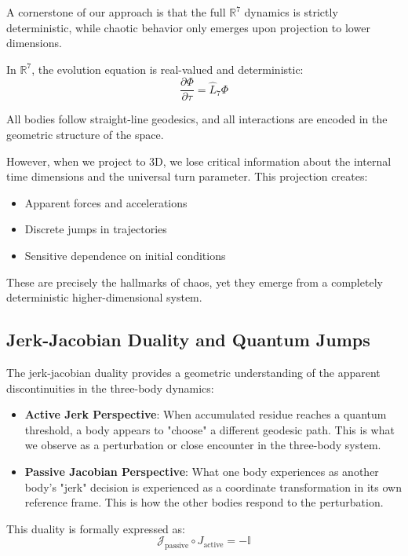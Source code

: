 \documentclass{article}
\begin{document}
A cornerstone of our approach is that the full $\mathbb{R}^7$ dynamics is strictly deterministic, while chaotic behavior only emerges upon projection to lower dimensions.

In $\mathbb{R}^7$, the evolution equation is real-valued and deterministic:
\begin{equation}
\frac{\partial \Phi}{\partial \tau} = \hat{L}_7 \Phi
\end{equation}

All bodies follow straight-line geodesics, and all interactions are encoded in the geometric structure of the space.

However, when we project to 3D, we lose critical information about the internal time dimensions and the universal turn parameter. This projection creates:
\begin{itemize}
\item Apparent forces and accelerations
\item Discrete jumps in trajectories
\item Sensitive dependence on initial conditions
\end{itemize}

These are precisely the hallmarks of chaos, yet they emerge from a completely deterministic higher-dimensional system.

\subsection{Jerk-Jacobian Duality and Quantum Jumps}

The jerk-jacobian duality provides a geometric understanding of the apparent discontinuities in the three-body dynamics:

\begin{itemize}
\item \textbf{Active Jerk Perspective}: When accumulated residue reaches a quantum threshold, a body appears to "choose" a different geodesic path. This is what we observe as a perturbation or close encounter in the three-body system.

\item \textbf{Passive Jacobian Perspective}: What one body experiences as another body's "jerk" decision is experienced as a coordinate transformation in its own reference frame. This is how the other bodies respond to the perturbation.
\end{itemize}

This duality is formally expressed as:
\begin{equation}
\mathcal{J}_{\text{passive}} \circ J_{\text{active}} = -\mathbb{I}
\end{equation}
\end{document}

